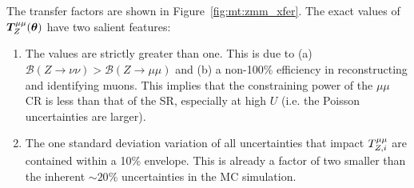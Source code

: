 The transfer factors are shown in Figure~\ref{fig:mt:zmm_xfer}.
The exact values of $\bm{T}^{\mu\mu}_{Z}(\bm\theta)$ have two salient features:
\begin{enumerate}
    \item The values are strictly greater than one.
        This is due to (a) $\mathcal{B}(Z\rightarrow\nu\nu)>\mathcal{B}(Z\rightarrow\mu\mu)$ and (b) a non-100\% efficiency in reconstructing and identifying muons.
        This implies that the constraining power of the $\mu\mu$ CR is less than that of the SR, especially at high $U$ (i.e. the Poisson uncertainties are larger).
    \item The one standard deviation variation of all uncertainties that impact ${T}^{\mu\mu}_{Z,i}$ are contained within a 10\% envelope.
        This is already a factor of two smaller than the inherent $\sim20\%$ uncertainties in the MC simulation.
\end{enumerate}

